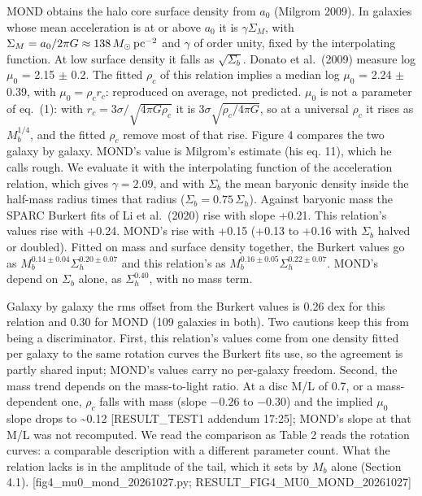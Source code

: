 \documentclass[
  10pt,
]{article}
\begin{document}
MOND obtains the halo core surface density from $a_0$ (Milgrom 2009). In galaxies whose mean acceleration is at or above $a_0$ it is $\gamma\Sigma_M$, with $\Sigma_M=a_0/2\pi G\approx138\,M_\odot\,{\rm pc}^{-2}$ and $\gamma$ of order unity, fixed by the interpolating function. At low surface density it falls as $\sqrt{\Sigma_b}$. Donato et al.~(2009) measure log $\mu_0$ = 2.15 $\pm$ 0.2. The fitted $\rho_c$ of this relation implies a median log $\mu_0$ = 2.24 $\pm$ 0.39, with $\mu_0=\rho_c r_c$: reproduced on average, not predicted. $\mu_0$ is not a parameter of eq.~(1): with $r_c=3\sigma/\sqrt{4\pi G\rho_c}$ it is $3\sigma\sqrt{\rho_c/4\pi G}$, so at a universal $\rho_c$ it rises as $M_b^{1/4}$, and the fitted $\rho_c$ remove most of that rise. Figure 4 compares the two galaxy by galaxy. MOND's value is Milgrom's estimate (his eq. 11), which he calls rough. We evaluate it with the interpolating function of the acceleration relation, which gives $\gamma=2.09$, and with $\Sigma_b$ the mean baryonic density inside the half-mass radius times that radius ($\Sigma_b=0.75\,\Sigma_h$). Against baryonic mass the SPARC Burkert fits of Li et al.~(2020) rise with slope +0.21. This relation's values rise with +0.24. MOND's rise with +0.15 (+0.13 to +0.16 with $\Sigma_b$ halved or doubled). Fitted on mass and surface density together, the Burkert values go as $M_b^{0.14\pm0.04}\Sigma_h^{0.20\pm0.07}$ and this relation's as $M_b^{0.16\pm0.05}\Sigma_h^{0.22\pm0.07}$. MOND's depend on $\Sigma_b$ alone, as $\Sigma_h^{0.40}$, with no mass term.

Galaxy by galaxy the rms offset from the Burkert values is 0.26 dex for this relation and 0.30 for MOND (109 galaxies in both). Two cautions keep this from being a discriminator. First, this relation's values come from one density fitted per galaxy to the same rotation curves the Burkert fits use, so the agreement is partly shared input; MOND's values carry no per-galaxy freedom. Second, the mass trend depends on the mass-to-light ratio. At a disc M/L of 0.7, or a mass-dependent one, $\rho_c$ falls with mass (slope $-0.26$ to $-0.30$) and the implied $\mu_0$ slope drops to \textasciitilde{}0.12 {[}RESULT\_TEST1 addendum 17:25{]}; MOND's slope at that M/L was not recomputed. We read the comparison as Table 2 reads the rotation curves: a comparable description with a different parameter count. What the relation lacks is in the amplitude of the tail, which it sets by $M_b$ alone (Section 4.1). {[}fig4\_mu0\_mond\_20261027.py; RESULT\_FIG4\_MU0\_MOND\_20261027{]}
\end{document}
